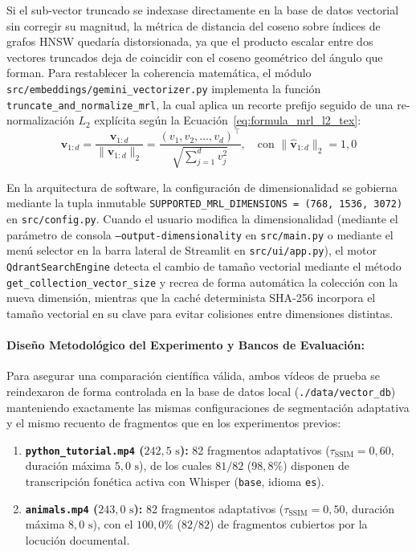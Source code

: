 Si el sub-vector truncado se indexase directamente en la base de datos vectorial sin corregir su magnitud, la métrica de distancia del coseno sobre índices de grafos HNSW quedaría distorsionada, ya que el producto escalar entre dos vectores truncados deja de coincidir con el coseno geométrico del ángulo que forman. Para restablecer la coherencia matemática, el módulo \texttt{src/embeddings/gemini\_vectorizer.py} implementa la función \texttt{truncate\_and\_normalize\_mrl}, la cual aplica un recorte prefijo seguido de una re-normalización $L_2$ explícita según la Ecuación~\eqref{eq:formula_mrl_l2_tex}:
\begin{equation}
\hat{\mathbf{v}}_{1:d} = \frac{\mathbf{v}_{1:d}}{\|\mathbf{v}_{1:d}\|_2} = \frac{(v_1, v_2, \dots, v_d)^\top}{\sqrt{\sum_{j=1}^{d} v_j^2}}, \quad \text{con } \|\hat{\mathbf{v}}_{1:d}\|_2 = 1,0
\label{eq:formula_mrl_l2_tex}
\end{equation}

En la arquitectura de software, la configuración de dimensionalidad se gobierna mediante la tupla inmutable \texttt{SUPPORTED\_MRL\_DIMENSIONS = (768, 1536, 3072)} en \texttt{src/config.py}. Cuando el usuario modifica la dimensionalidad (mediante el parámetro de consola \texttt{--output-dimensionality} en \texttt{src/main.py} o mediante el menú selector en la barra lateral de Streamlit en \texttt{src/ui/app.py}), el motor \texttt{QdrantSearchEngine} detecta el cambio de tamaño vectorial mediante el método \texttt{get\_collection\_vector\_size} y recrea de forma automática la colección con la nueva dimensión, mientras que la caché determinista SHA-256 incorpora el tamaño vectorial en su clave para evitar colisiones entre dimensiones distintas.

\paragraph{Diseño Metodológico del Experimento y Bancos de Evaluación:}
Para asegurar una comparación científica válida, ambos vídeos de prueba se reindexaron de forma controlada en la base de datos local (\texttt{./data/vector\_db}) manteniendo exactamente las mismas configuraciones de segmentación adaptativa y el mismo recuento de fragmentos que en los experimentos previos:
\begin{enumerate}
    \item \textbf{\texttt{python\_tutorial.mp4} ($242,5\text{ s}$):} 82 fragmentos adaptativos ($\tau_{\text{SSIM}} = 0,60$, duración máxima $5,0\text{ s}$), de los cuales $81/82$ ($98,8\%$) disponen de transcripción fonética activa con Whisper (\texttt{base}, idioma \texttt{es}).
    \item \textbf{\texttt{animals.mp4} ($243,0\text{ s}$):} 82 fragmentos adaptativos ($\tau_{\text{SSIM}} = 0,50$, duración máxima $8,0\text{ s}$), con el $100,0\%$ ($82/82$) de fragmentos cubiertos por la locución documental.
\end{enumerate}

